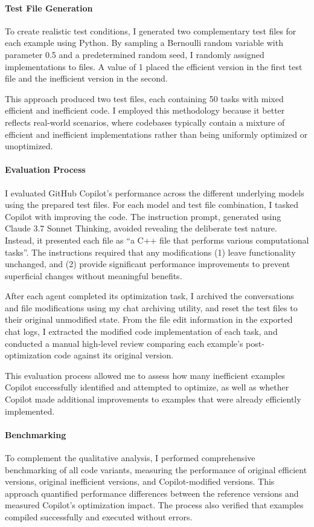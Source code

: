 \paragraph{Test File Generation}
To create realistic test conditions, I generated two complementary test files for each example using Python.
By sampling a Bernoulli random variable with parameter 0.5 and a predetermined random seed, I randomly assigned implementations to files.
A value of 1 placed the efficient version in the first test file and the inefficient version in the second.

This approach produced two test files, each containing 50 tasks with mixed efficient and inefficient code.
I employed this methodology because it better reflects real-world scenarios, where codebases typically contain a mixture of efficient and inefficient implementations rather than being uniformly optimized or unoptimized.

\paragraph{Evaluation Process}
I evaluated GitHub Copilot's performance across the different underlying models using the prepared test files.
For each model and test file combination, I tasked Copilot with improving the code.
The instruction prompt, generated using Claude 3.7 Sonnet Thinking, avoided revealing the deliberate test nature.
Instead, it presented each file as \enquote{a C++ file that performs various computational tasks}.
The instructions required that any modifications (1) leave functionality unchanged, and (2) provide significant performance improvements to prevent superficial changes without meaningful benefits.

After each agent completed its optimization task, I archived the conversations and file modifications using my chat archiving utility, and reset the test files to their original unmodified state.
From the file edit information in the exported chat logs, I extracted the modified code implementation of each task, and conducted a manual high-level review comparing each example's post-optimization code against its original version.

This evaluation process allowed me to assess how many inefficient examples Copilot successfully identified and attempted to optimize, as well as whether Copilot made additional improvements to examples that were already efficiently implemented.

\paragraph{Benchmarking}
To complement the qualitative analysis, I performed comprehensive benchmarking of all code variants, measuring the performance of original efficient versions, original inefficient versions, and Copilot-modified versions.
This approach quantified performance differences between the reference versions and measured Copilot's optimization impact.
The process also verified that examples compiled successfully and executed without errors.

